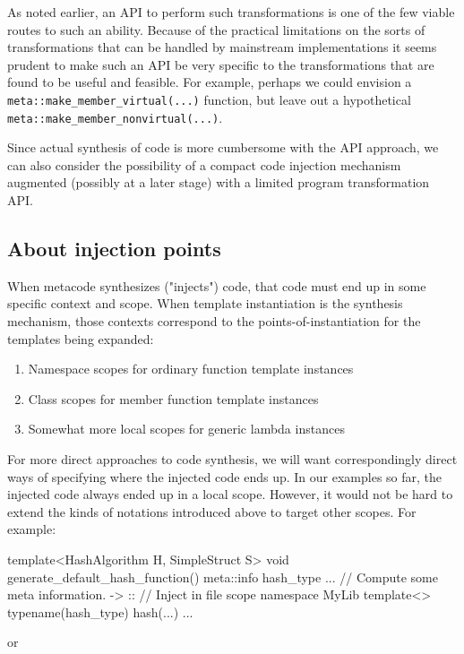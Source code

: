 \documentclass{wg21}
\newcommand{\cc}[1]{\texttt{#1}}
\begin{document}
As noted earlier, an API to perform such transformations is one of the few viable
routes to such an ability. Because of the practical limitations on the sorts of
transformations that can be handled by mainstream implementations it seems prudent
to make such an API be very specific to the transformations that are found to be
useful and feasible. For example, perhaps we could envision a \cc{meta::make_member_virtual(...)}
function, but leave out a hypothetical \cc{meta::make_member_nonvirtual(...)}.

Since actual synthesis of code is more cumbersome with the API approach, we can
also consider the possibility of a compact code injection mechanism augmented
(possibly at a later stage) with a limited program transformation API.

\subsection{About injection points}
When metacode synthesizes ("injects") code, that code must end up in some
specific context and scope. When template instantiation is the synthesis
mechanism, those contexts correspond to the points-of-instantiation for the
templates being expanded:

\begin{enumerate}
  \item Namespace scopes for ordinary function template instances
  \item Class scopes for member function template instances
  \item Somewhat more local scopes for generic lambda instances
\end{enumerate}

For more direct approaches to code synthesis, we will want correspondingly
direct ways of specifying where the injected code ends up. In our examples
so far, the injected code always ended up in a local scope. However, it would
not be hard to extend the kinds of notations introduced above to target other
scopes. For example:

\begin{cpp}
template<HashAlgorithm H, SimpleStruct S>
void generate_default_hash_function() {
  meta::info hash_type ...  // Compute some meta information.
  -> :: {  // Inject in file scope
    namespace MyLib {
      template<> typename(hash_type) hash(...) {
         ...
      }
    }
  }
}
\end{cpp}

or
\end{document}

